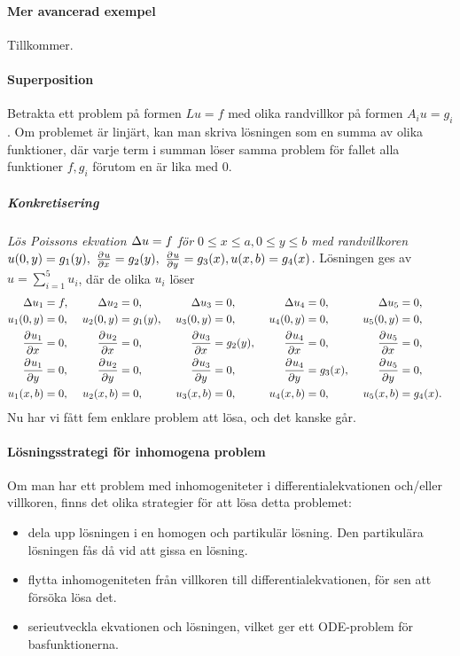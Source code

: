 \paragraph{Mer avancerad exempel}
Tillkommer.

\paragraph{Superposition}
Betrakta ett problem på formen $Lu = f$ med olika randvillkor på formen $A_{i}u = g_{i}$. Om problemet är linjärt, kan man skriva lösningen som en summa av olika funktioner, där varje term i summan löser samma problem för fallet alla funktioner $f, g_{i}$ förutom en är lika med $0$.

\subparagraph{Konkretisering}
\textit{
Lös Poissons ekvation $\Delta u = f$ för $0\leq x\leq a, 0\leq y\leq b$ med randvillkoren $u(0, y) = g_{1}(y),\ \pdeval{u}{x}{a, y} = g_{2}(y),\ \pdeval{u}{y}{x, 0} = g_{3}(x), u(x, b) = g_{4}(x)$.
}
Lösningen ges av $u = \sum\limits_{i = 1}^{5}u_{i}$, där de olika $u_{i}$ löser
\begin{alignat*}{7}
	\laplace{u_{1}}         &= f,&\ \laplace{u_{2}}         &= 0,       &\        \laplace{u_{3}}         &= 0,&\        \laplace{u_{4}}         &= 0,&\        \laplace{u_{5}}         &= 0,& \\
	u_{1}(0, y)             &= 0,&\ u_{2}(0, y)             &= g_{1}(y),&\ u_{3}(0, y)             &= 0,&\ u_{4}(0, y)             &= 0,&\ u_{5}(0, y)             &= 0,& \\
	\pdeval{u_{1}}{x}{a, y} &= 0,&\ \pdeval{u_{2}}{x}{a, y} &= 0,       &\ \pdeval{u_{3}}{x}{a, y} &= g_{2}(y),&\ \pdeval{u_{4}}{x}{a, y} &= 0,&\ \pdeval{u_{5}}{x}{a, y} &= 0,& \\
	\pdeval{u_{1}}{y}{x, 0} &= 0,&\ \pdeval{u_{2}}{y}{x, 0} &= 0,       &\ \pdeval{u_{3}}{y}{x, 0} &= 0,&\ \pdeval{u_{4}}{y}{x, 0} &= g_{3}(x),&\ \pdeval{u_{5}}{y}{x, 0} &= 0,& \\
	u_{1}(x, b)             &= 0,&\ u_{2}(x, b)             &= 0,       &\ u_{3}(x, b)             &= 0,&\ u_{4}(x, b)             &= 0,&\ u_{5}(x, b)             &= g_{4}(x).&
\end{alignat*}
Nu har vi fått fem enklare problem att lösa, och det kanske går.

\paragraph{Lösningsstrategi för inhomogena problem}
Om man har ett problem med inhomogeniteter i differentialekvationen och/eller villkoren, finns det olika strategier för att lösa detta problemet:
\begin{itemize}
	\item dela upp lösningen i en homogen och partikulär lösning. Den partikulära lösningen fås då vid att gissa en lösning.
	\item flytta inhomogeniteten från villkoren till differentialekvationen, för sen att försöka lösa det.
	\item serieutveckla ekvationen och lösningen, vilket ger ett ODE-problem för basfunktionerna.
\end{itemize}

